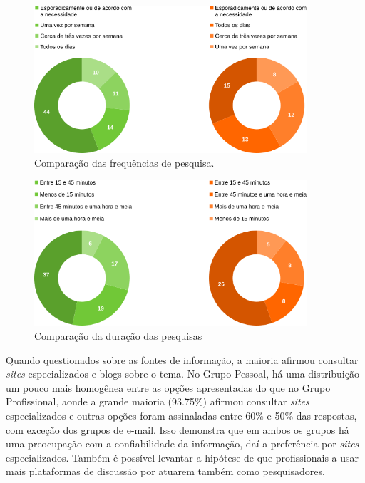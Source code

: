 \begin{figure}[!htbp]
\centering
\caption{\label{graf-freq}Comparação das frequências de pesquisa.}
\includegraphics[width=0.9\textwidth]{images/drive/image_14.png}
\end{figure}

\begin{figure}[!htbp]
\centering
\caption{\label{graf-tempo}Comparação da duração das pesquisas}
\includegraphics[width=0.9\textwidth]{images/drive/image_15.png}
\end{figure}


Quando questionados sobre as fontes de informação, a maioria afirmou consultar \emph{sites} especializados e blogs sobre o tema. No Grupo Pessoal, há uma distribuição um pouco mais homogênea entre as opções apresentadas do que no Grupo Profissional, aonde a grande maioria (93.75\%) afirmou consultar \emph{sites} especializados e outras opções foram assinaladas entre 60\% e 50\% das respostas, com exceção dos grupos de e-mail. Isso demonstra que em ambos os grupos há uma preocupação com a confiabilidade da informação, daí a preferência por \emph{sites} especializados. Também é possível levantar a hipótese de que profissionais a usar mais plataformas de discussão por atuarem também como pesquisadores.


